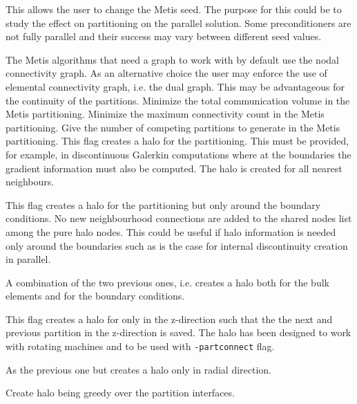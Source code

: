 This allows the user to change the Metis seed. The purpose for this could be
to study the effect on partitioning on the parallel solution.
Some preconditioners are not fully parallel and their success may vary between
different seed values. 

The Metis algorithms that need a graph to work with by default use the nodal connectivity graph. As an
alternative choice the user may enforce the use of elemental connectivity graph, i.e. the dual graph. 
This may be advantageous for the continuity of the partitions. 
%
Minimize the total communication volume in the Metis partitioning.
%
Minimize the maximum connectivity count in the Metis partitioning.
%
Give the number of competing partitions to generate in the Metis partitioning.
%
This flag creates a halo for the partitioning. This must be provided, for example, in
discontinuous Galerkin computations where at the boundaries the gradient information 
must also be computed. The halo is created for all nearest neighbours. 

This flag creates a halo for the partitioning but only around the boundary conditions. 
No new neighbourhood connections are added to the shared nodes list among the pure halo nodes. 
This could be useful if halo information is needed only around the boundaries such as is the case 
for internal discontinuity creation in parallel. 

A combination of the two previous ones, i.e. creates a halo both for the
bulk elements and for the boundary conditions.

This flag creates a halo for only in the z-direction such that the the next and previous partition in
the z-direction is saved. The halo has been designed to work with rotating machines and to be used with 
\texttt{-partconnect} flag.

As the previous one but creates a halo only in radial direction.

Create halo being greedy over the partition interfaces. 

